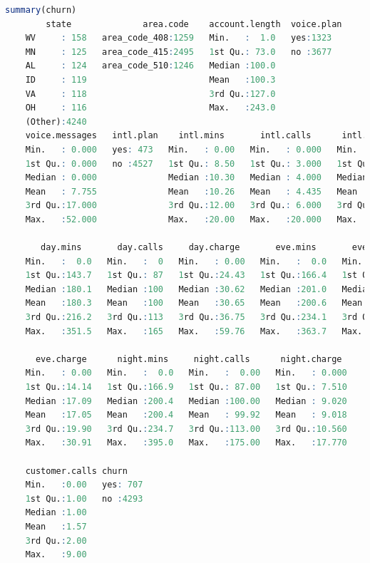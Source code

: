 \documentclass[
]{book}
\theoremstyle{definition}
\theoremstyle{definition}
\theoremstyle{definition}
\theoremstyle{definition}
\theoremstyle{remark}
\begin{document}
\begin{lstlisting}[language=R]
summary(churn)
        state              area.code    account.length  voice.plan
    WV     : 158   area_code_408:1259   Min.   :  1.0   yes:1323  
    MN     : 125   area_code_415:2495   1st Qu.: 73.0   no :3677  
    AL     : 124   area_code_510:1246   Median :100.0             
    ID     : 119                        Mean   :100.3             
    VA     : 118                        3rd Qu.:127.0             
    OH     : 116                        Max.   :243.0             
    (Other):4240                                                  
    voice.messages   intl.plan    intl.mins       intl.calls      intl.charge   
    Min.   : 0.000   yes: 473   Min.   : 0.00   Min.   : 0.000   Min.   :0.000  
    1st Qu.: 0.000   no :4527   1st Qu.: 8.50   1st Qu.: 3.000   1st Qu.:2.300  
    Median : 0.000              Median :10.30   Median : 4.000   Median :2.780  
    Mean   : 7.755              Mean   :10.26   Mean   : 4.435   Mean   :2.771  
    3rd Qu.:17.000              3rd Qu.:12.00   3rd Qu.: 6.000   3rd Qu.:3.240  
    Max.   :52.000              Max.   :20.00   Max.   :20.000   Max.   :5.400  
                                                                                
       day.mins       day.calls     day.charge       eve.mins       eve.calls    
    Min.   :  0.0   Min.   :  0   Min.   : 0.00   Min.   :  0.0   Min.   :  0.0  
    1st Qu.:143.7   1st Qu.: 87   1st Qu.:24.43   1st Qu.:166.4   1st Qu.: 87.0  
    Median :180.1   Median :100   Median :30.62   Median :201.0   Median :100.0  
    Mean   :180.3   Mean   :100   Mean   :30.65   Mean   :200.6   Mean   :100.2  
    3rd Qu.:216.2   3rd Qu.:113   3rd Qu.:36.75   3rd Qu.:234.1   3rd Qu.:114.0  
    Max.   :351.5   Max.   :165   Max.   :59.76   Max.   :363.7   Max.   :170.0  
                                                                                 
      eve.charge      night.mins     night.calls      night.charge   
    Min.   : 0.00   Min.   :  0.0   Min.   :  0.00   Min.   : 0.000  
    1st Qu.:14.14   1st Qu.:166.9   1st Qu.: 87.00   1st Qu.: 7.510  
    Median :17.09   Median :200.4   Median :100.00   Median : 9.020  
    Mean   :17.05   Mean   :200.4   Mean   : 99.92   Mean   : 9.018  
    3rd Qu.:19.90   3rd Qu.:234.7   3rd Qu.:113.00   3rd Qu.:10.560  
    Max.   :30.91   Max.   :395.0   Max.   :175.00   Max.   :17.770  
                                                                     
    customer.calls churn     
    Min.   :0.00   yes: 707  
    1st Qu.:1.00   no :4293  
    Median :1.00             
    Mean   :1.57             
    3rd Qu.:2.00             
    Max.   :9.00             
   
\end{lstlisting}
\end{document}
